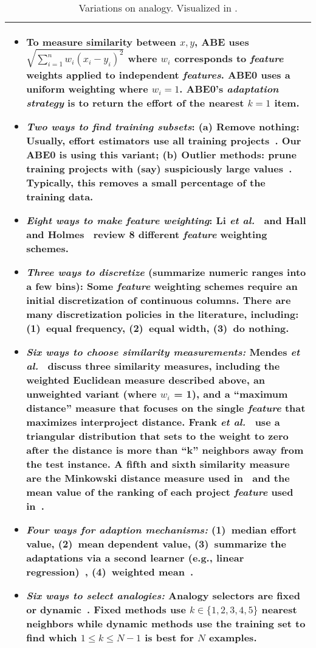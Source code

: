 \begin{table}[!t]
\caption{Variations on analogy. 
 Visualized in
.}\label{tbl:aben}

\begin{tabular}{|p{.94\linewidth}|}\hline

\begin{itemize}[leftmargin=0.1in]
\item
To measure    similarity between  $x,y$, 
ABE uses $\sqrt{\sum_{i=1}^n w_i(x_i-y_i)^2}$ where  $w_i$ corresponds to {\em feature} weights applied to independent {\em features}. ABE0 uses a uniform weighting where $w_i=1$.
ABE0's {\em adaptation strategy} is to return the  effort   of the nearest $k=1$   item.
\item
{\em Two ways to find training subsets}:
(a) Remove nothing: Usually, effort estimators use all training projects~\cite{chang1974finding}. Our ABE0 is using this variant;
(b) Outlier methods: prune training projects with (say) suspiciously large  values~\cite{keung2008analogy}. Typically, this removes a small percentage of the training data.
\item
{\em Eight ways to make feature weighting}:
Li {\it et al.}~\cite{li2009study} and Hall and Holmes~\cite{hall2003benchmarking} review 8 different {\em feature} weighting schemes.
\item
  {\em Three ways to discretize} (summarize numeric ranges into a few bins):
Some {\em feature} weighting schemes require an initial discretization of continuous  columns. There are many discretization policies in the literature, including:
(1)~equal frequency,
(2)~equal width, 
(3)~do nothing.
\item
{\em Six ways to choose similarity measurements:}
Mendes {\it et al.}~\cite{mendes2003comparative} discuss three similarity measures, including the weighted Euclidean measure described above, an unweighted variant (where $w_i$ = 1), and a ``maximum distance'' measure that focuses on the single {\em feature} that maximizes interproject distance. Frank {\it et al.}~\cite{frank2002locally} use a triangular distribution that sets to the weight to zero after the distance is more than ``k'' neighbors away from the test instance. A fifth and sixth similarity measure are the Minkowski distance measure used in~\cite{angelis2000simulation} and the mean value of the ranking of each project {\em feature} used in~\cite{walkerden1999empirical}.
\item
{\em Four ways for adaption mechanisms:} 
(1)~median effort value,
(2)~mean dependent value,
(3)~summarize the adaptations via a second learner (e.g., linear regression)~\cite{li2009study,menzies2006selecting,baker2007hybrid,quinlan1992learning},
(4)~weighted mean~\cite{mendes2003comparative}.
\item
{\em Six ways to select analogies:}
Analogy selectors  are  fixed or dynamic~\cite{teak2012}. Fixed methods use $k\in\{1,2,3,4,5\}$
nearest neighbors
while  dynamic methods use the training set to find which $1 \le k \le N-1$ is best for   $N$ examples.
\end{itemize}
\\\hline
\end{tabular}
\end{table}